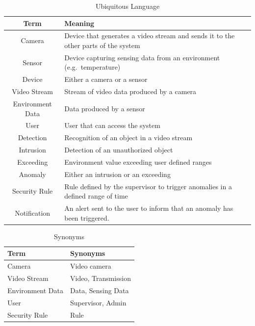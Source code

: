 \documentclass{scrartcl}
\begin{document}
    \renewcommand{\arraystretch}{1.5}
    \begin{table}
        \centering
        \begin{tabularx}{0.7\textwidth}{ | c | >{\centering\arraybackslash}X | }
            \hline
            \textbf{Term} & \textbf{Meaning} \\
            \hline
            Camera & Device that generates a video stream and sends it to the other parts of the system \\
            \hline
            Sensor & Device capturing sensing data from an environment (e.g.\ temperature) \\
            \hline
            Device & Either a camera or a sensor \\
            \hline
            Video Stream & Stream of video data produced by a camera \\
            \hline
            Environment Data & Data produced by a sensor \\
            \hline
            User & User that can access the system \\
            \hline
            Detection & Recognition of an object in a video stream \\
            \hline
            Intrusion & Detection of an unauthorized object \\
            \hline
            Exceeding & Environment value exceeding user defined ranges \\
            \hline
            Anomaly & Either an intrusion or an exceeding \\
            \hline
            Security Rule & Rule defined by the supervisor to trigger anomalies in a defined range of time \\
            \hline
            Notification & An alert sent to the user to inform that an anomaly has been triggered. \\
            \hline
        \end{tabularx}
        \caption{Ubiquitous Language}
        \label{tab:ubiquitous-language}
    \end{table}

    \renewcommand{\arraystretch}{1.8}
    \begin{table}
        \centering
        \begin{tabularx}{0.6\textwidth}{ | >{\centering\arraybackslash}X | >{\centering\arraybackslash}X | }
            \hline
            \textbf{Term} & \textbf{Synonyms} \\
            \hline
            Camera & Video camera \\
            \hline
            Video Stream & Video, Transmission \\
            \hline
            Environment Data & Data, Sensing Data \\
            \hline
            User & Supervisor, Admin \\
            \hline
            Security Rule & Rule \\
            \hline
        \end{tabularx}
        \caption{Synonyms}
        \label{tab:synonyms}
    \end{table}
\end{document}
